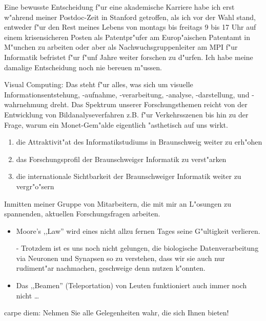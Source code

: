 Eine bewusste Entscheidung f"ur eine akademische Karriere habe ich erst w"ahrend meiner Postdoc-Zeit in Stanford getroffen, als ich vor der Wahl stand, entweder f"ur den Rest meines Lebens von montags bis freitags 9 bis 17 Uhr auf einem krisensicheren Posten als Patentpr"ufer am Europ"aischen Patentamt in M"unchen zu arbeiten oder aber als Nachwuchsgruppenleiter am MPI f"ur Informatik befristet f"ur f"unf Jahre weiter forschen zu d"urfen. Ich habe meine damalige Entscheidung noch nie bereuen m"ussen.



Visual Computing: Das steht f"ur alles, was sich um visuelle Informationsentstehung, -aufnahme, -verarbeitung, -analyse, -darstellung, und -wahrnehmung dreht. Das Spektrum unserer Forschungsthemen reicht von der Entwicklung von Bildanalyseverfahren z.B. f"ur Verkehrsszenen bis hin zu der Frage, warum ein Monet-Gem"alde eigentlich "asthetisch auf uns wirkt.


\begin{enumerate}
\item die Attraktivit"at des Informatikstudiums in Braunschweig weiter zu erh"ohen
\item das Forschungsprofil der Braunschweiger Informatik zu verst"arken
\item die internationale Sichtbarkeit der Braunschweiger Informatik weiter zu vergr"o"sern
\end{enumerate}


Inmitten meiner Gruppe von Mitarbeitern, die mit mir an L"osungen zu spannenden, aktuellen Forschungsfragen arbeiten.


\begin{itemize}
\item Moore's ,,Law'' wird eines nicht allzu fernen Tages seine G"ultigkeit verlieren.

- Trotzdem ist es uns noch nicht gelungen, die biologische Datenverarbeitung via Neuronen und Synapsen so zu verstehen, dass wir sie auch nur rudiment"ar nachmachen, geschweige denn nutzen k"onnten.

\item Das ,,Beamen'' (Teleportation) von Leuten funktioniert auch immer noch nicht \dots
\end{itemize}


carpe diem: Nehmen Sie alle Gelegenheiten wahr, die sich Ihnen bieten! 
